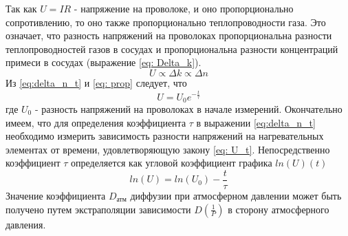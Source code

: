 Так как $U = IR$ - напряжение на проволоке, и оно пропорционально сопротивлению, то оно также пропорционально теплопроводности газа.
Это означает, что разность напряжений на проволоках пропорциональна разности теплопроводностей газов в сосудах и пропорциональна разности концентраций примеси в сосудах (выражение \eqref{eq: Delta_k}).
\begin{equation}
     U \propto \Delta k \propto \Delta n \label{eq: prop}
\end{equation}
Из \eqref{eq:delta_n_t} и \eqref{eq: prop} следует, что 
\begin{equation}
     U = U_0 e^{-\frac{t}{\tau}} \label{eq: U_t}
\end{equation}
где $U_0$ - разность напряжений на проволоках в начале измерений.
Окончательно имеем, что для определения коэффициента $\tau$ в выражении \eqref{eq:delta_n_t} необходимо измерить зависимость разности напряжений на нагревательных элементах от времени, удовлетворяющую закону \eqref{eq: U_t}.
Непосредственно коэффициент $\tau$ определяется как угловой коэффициент графика $ln(U)(t)$ 
\begin{equation}
     ln(U) = ln(U_0) - \frac{t}{\tau} \label{eq: ln(U)_t}
\end{equation}
Значение коэффициента $D_{\text{атм}}$ диффузии при атмосферном давлении может быть получено путем экстраполяции зависимости $D(\frac{1}{P})$ в сторону атмосферного давления. 